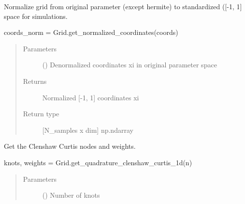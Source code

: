 \documentclass[letterpaper,10pt,english,openany,oneside]{sphinxmanual}
\begin{document}
\begin{fulllineitems}

\begin{fulllineitems}
\label{\detokenize{pygpc:pygpc.Grid.Grid.get_normalized_coordinates}}
Normalize grid from original parameter (except hermite) to standardized ({[}-1, 1{]} space for simulations.

coords\_norm = Grid.get\_normalized\_coordinates(coords)
\begin{quote}\begin{description}
\item[{Parameters}] \leavevmode
{} (\sphinxstyleliteralemphasis{\sphinxupquote{{[}}}\sphinxstyleliteralemphasis{\sphinxupquote{{]} }}) \textendash{} Denormalized coordinates xi in original parameter space

\item[{Returns}] \leavevmode
{} \textendash{} Normalized {[}-1, 1{]} coordinates xi

\item[{Return type}] \leavevmode
{[}N\_samples x dim{]} np.ndarray

\end{description}\end{quote}

\end{fulllineitems}


\begin{fulllineitems}
\label{\detokenize{pygpc:pygpc.Grid.Grid.get_quadrature_clenshaw_curtis_1d}}
Get the Clenshaw Curtis nodes and weights.

knots, weights = Grid.get\_quadrature\_clenshaw\_curtis\_1d(n)
\begin{quote}\begin{description}
\item[{Parameters}] \leavevmode
{} () \textendash{} Number of knots


\end{description}
\end{quote}
\end{fulllineitems}
\end{fulllineitems}
\end{document}
